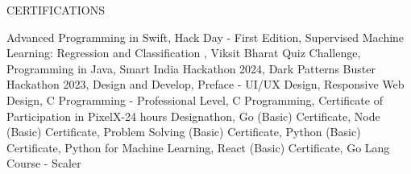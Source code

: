 \documentclass{resume}
\begin{document}
\begin{rSection}{CERTIFICATIONS}

    \begin{itemize}
        Advanced Programming in Swift, Hack Day - First Edition, Supervised Machine Learning: Regression and Classification , Viksit Bharat Quiz Challenge, Programming in Java, Smart India Hackathon 2024, Dark Patterns Buster Hackathon 2023, Design and Develop, Preface - UI/UX Design, Responsive Web Design, C Programming - Professional Level, C Programming, Certificate of Participation in PixelX-24 hours Designathon, Go (Basic) Certificate, Node (Basic) Certificate, Problem Solving (Basic) Certificate, Python (Basic) Certificate, Python for Machine Learning, React (Basic) Certificate, Go Lang Course - Scaler
    \end{itemize}
    
    \end{rSection}
    
    
    \vspace{1.5em}

    
    
\end{document}
